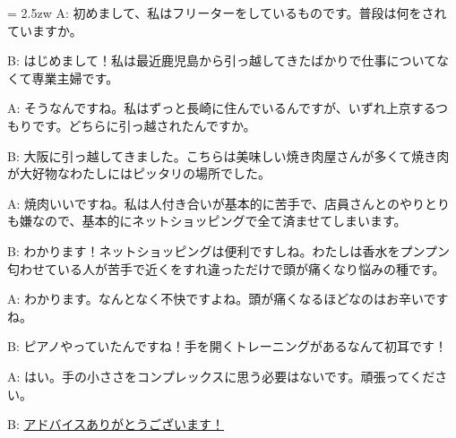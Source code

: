 \documentclass[11pt]{amsart}
\title{}
\author{}
\newenvironment{hangall}[1]{\hangindent = 2.5zw\everypar{\hangindent = 2.5zw}}{}
\begin{document}
\maketitle
\begin{hangall}{}%
A: 初めまして、私はフリーターをしているものです。普段は何をされていますか。

B: はじめまして！私は最近鹿児島から引っ越してきたばかりで仕事についてなくて専業主婦です。

A: そうなんですね。私はずっと長崎に住んでいるんですが、いずれ上京するつもりです。どちらに引っ越されたんですか。

B: 大阪に引っ越してきました。こちらは美味しい焼き肉屋さんが多くて焼き肉が大好物なわたしにはピッタリの場所でした。

A: 焼肉いいですね。私は人付き合いが基本的に苦手で、店員さんとのやりとりも嫌なので、基本的にネットショッピングで全て済ませてしまいます。

B: わかります！ネットショッピングは便利ですしね。わたしは香水をプンプン匂わせている人が苦手で近くをすれ違っただけで頭が痛くなり悩みの種です。

A: わかります。なんとなく不快ですよね。頭が痛くなるほどなのはお辛いですね。

B: ピアノやっていたんですね！手を開くトレーニングがあるなんて初耳です！

A: はい。手の小ささをコンプレックスに思う必要はないです。頑張ってください。

B: \ul{アドバイスありがとうございます！}\end{hangall}
\end{document}

